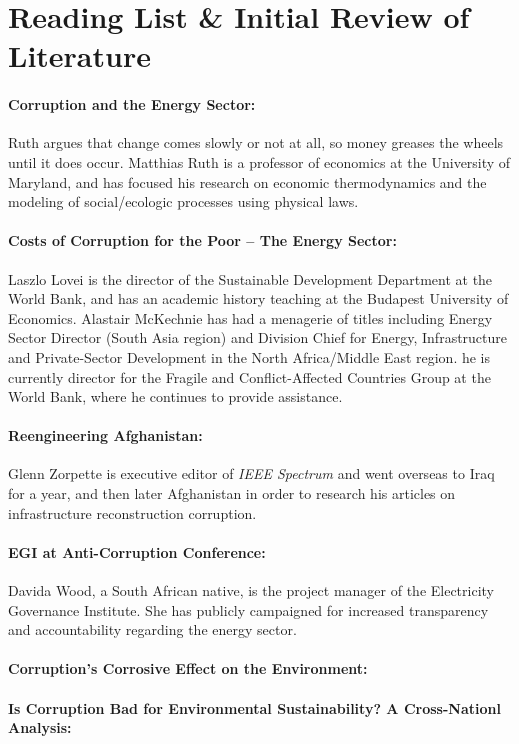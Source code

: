 \documentclass[11pt]{article}
\begin{document}
\newpage

\section*{Reading List \& Initial Review of Literature}
\paragraph{\cite{msi_ruth_02} Corruption and the Energy Sector:} Ruth argues that change comes slowly or not at all, so money greases the wheels until it does occur. Matthias Ruth is a professor of economics at the University of Maryland, and has focused his research on economic thermodynamics and the modeling of social/ecologic processes using physical laws.

\paragraph{\cite{lovei_alastair_00} Costs of Corruption for the Poor -- The Energy Sector:}
 Laszlo Lovei is the director of the Sustainable Development Department at the World Bank, and has an academic history teaching at the Budapest University of Economics. Alastair McKechnie has had a menagerie of titles including Energy Sector Director (South Asia region) and Division Chief for Energy, Infrastructure and Private-Sector Development in the North Africa/Middle East region. he is currently director for the Fragile and Conflict-Affected Countries Group at the World Bank, where he continues to provide assistance.

\paragraph{\cite{ieeespec_zorpette_11} Reengineering Afghanistan:} Glenn Zorpette is executive editor of \emph{IEEE Spectrum} and went overseas to Iraq for a year, and then later Afghanistan in order to research his articles on infrastructure reconstruction corruption. 

\paragraph{\cite{egi_wood_10} EGI at Anti-Corruption Conference:} Davida Wood, a South African native, is the project manager of the Electricity Governance Institute. She has publicly campaigned for increased transparency and accountability regarding the energy sector.

\paragraph{\cite{wri_mock_04} Corruption's Corrosive Effect on the Environment:}

\paragraph{\cite{eas_morse_06} Is Corruption Bad for Environmental Sustainability? A Cross-Nationl Analysis:}



\end{document}
